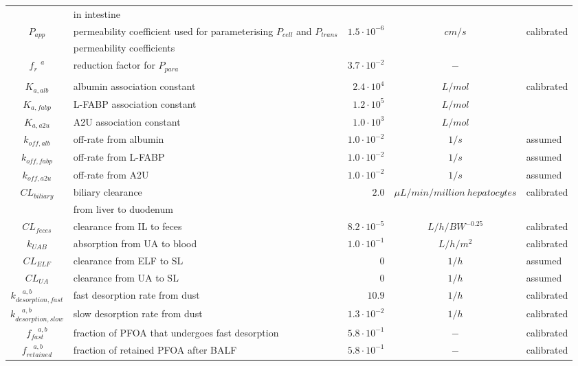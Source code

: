 \documentclass[preprint,12pt,authoryear]{elsarticle}
\begin{document}
\begin{table}[H]
{\begin{tabular}{clrcl}
& in intestine & & & \\
\multirow[t]{2}{*}{$P_{app}$} & permeability coefficient used for parameterising $P_{cell}$ and $P_{trans}$  & \multirow[t]{2}{*}{$1.5 \cdot 10^{-6}$} & \multirow[t]{2}{*}{$cm/s$} & \multirow[t]{2}{*}{calibrated} \\
& permeability coefficients & & & \\
\multirow[t]{2}{*}{$f_{r}^ {\quad a}$} & reduction factor for $P_{para}$ & \multirow[t]{2}{*}{$3.7 \cdot 10^{-2}$} & \multirow[t]{2}{*}{$-$} & \multirow[t]{2}{*}{\citep{ryu_2024}} \\
&  & & & \\
$K_{a,alb}$ & albumin association constant & $ 2.4 \cdot 10^4$ & $L/mol$ & calibrated \\
$K_{a,fabp}$ & L-FABP association constant &  $1.2 \cdot 10^5$ & $L/mol$ & \citep{sheng_2018} \\
$K_{a,a2u}$ & A2U association constant & $ 1.0 \cdot 10^3$ & $L/mol$ & \citep{han_2004} \\
$k_{off,alb}$ & off-rate from albumin & $1.0 \cdot 10^{-2}$ & $1/s$ & assumed \\
$k_{off,fabp}$ & off-rate from L-FABP &  $1.0 \cdot 10^{-2}$ & $1/s$ & assumed \\
$k_{off,a2u}$ & off-rate from A2U & $1.0 \cdot 10^{-2}$ & $1/s$ & assumed \\
\multirow[t]{2}{*}{$CL_{biliary}$} & biliary clearance  & \multirow[t]{2}{*}{$2.0$} & \multirow[t]{2}{*}{$\mu L/min/million\ hepatocytes$} & \multirow[t]{2}{*}{calibrated} \\
& from liver to duodenum & & & \\
$CL_{feces}$ & clearance from IL to feces & $8.2 \cdot 10^{-5}$ & $L/h/BW^{-0.25}$ & calibrated \\
$k_{UAB}$ & absorption from UA to blood & $1.0 \cdot 10^{-1}$ & $L/h/m^2$ & calibrated \\
$CL_{ELF}$ & clearance from  ELF to SL & $0$ & $1/h$ & assumed \\
$CL_{UA}$ & clearance from UA to SL& $0$ & $1/h$ & assumed \\
$k_{desorption, fast}^{\quad a,b}$ & fast desorption rate from dust & $10.9$ & $1/h$ & calibrated \\
$k_{desorption, slow}^ {\quad a,b}$ & slow desorption rate from dust & $1.3 \cdot 10^{-2}$ & $1/h$ & calibrated \\
$f_{fast}^ {\quad a,b}$ & fraction of PFOA that undergoes fast desorption & $5.8 \cdot 10^{-1}$ & $-$ & calibrated \\
$f_{retained}^ {\quad a,b}$ & fraction of retained PFOA after BALF & $5.8 \cdot 10^{-1}$ & $-$ & calibrated \\
\bottomrule
\end{tabular}
}


\end{table}
\end{document}
